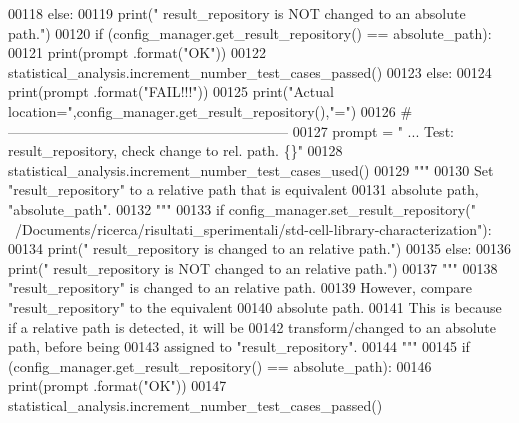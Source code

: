 \begin{DoxyCode}
00118         \textcolor{keywordflow}{else}:
00119             print(\textcolor{stringliteral}{" result\_repository is NOT changed to an absolute path."})
00120         \textcolor{keywordflow}{if} (config\_manager.get\_result\_repository() == absolute\_path):
00121             print(prompt .format(\textcolor{stringliteral}{"OK"}))
00122             statistical\_analysis.increment\_number\_test\_cases\_passed()
00123         \textcolor{keywordflow}{else}:
00124             print(prompt .format(\textcolor{stringliteral}{"FAIL!!!"}))
00125             print(\textcolor{stringliteral}{"Actual location="},config\_manager.get\_result\_repository(),\textcolor{stringliteral}{"="})
00126         \textcolor{comment}{# ------------------------------------------------------------}
00127         prompt = \textcolor{stringliteral}{"  ... Test: result\_repository, check change to rel. path. \{\}"}
00128         statistical\_analysis.increment\_number\_test\_cases\_used()
00129         \textcolor{stringliteral}{"""}
00130 \textcolor{stringliteral}{            Set "result\_repository" to a relative path that is equivalent}
00131 \textcolor{stringliteral}{                absolute path, "absolute\_path".}
00132 \textcolor{stringliteral}{        """}
00133         \textcolor{keywordflow}{if} config\_manager.set\_result\_repository(\textcolor{stringliteral}{"
      ~/Documents/ricerca/risultati\_sperimentali/std-cell-library-characterization"}):
00134             print(\textcolor{stringliteral}{" result\_repository is changed to an relative path."})
00135         \textcolor{keywordflow}{else}:
00136             print(\textcolor{stringliteral}{" result\_repository is NOT changed to an relative path."})
00137         \textcolor{stringliteral}{"""}
00138 \textcolor{stringliteral}{            "result\_repository" is changed to an relative path.}
00139 \textcolor{stringliteral}{            However, compare "result\_repository" to the equivalent}
00140 \textcolor{stringliteral}{                absolute path.}
00141 \textcolor{stringliteral}{            This is because if a relative path is detected, it will be}
00142 \textcolor{stringliteral}{                transform/changed to an absolute path, before being}
00143 \textcolor{stringliteral}{                assigned to "result\_repository".}
00144 \textcolor{stringliteral}{        """}
00145         \textcolor{keywordflow}{if} (config\_manager.get\_result\_repository() == absolute\_path):
00146             print(prompt .format(\textcolor{stringliteral}{"OK"}))
00147             statistical\_analysis.increment\_number\_test\_cases\_passed()

\end{DoxyCode}
